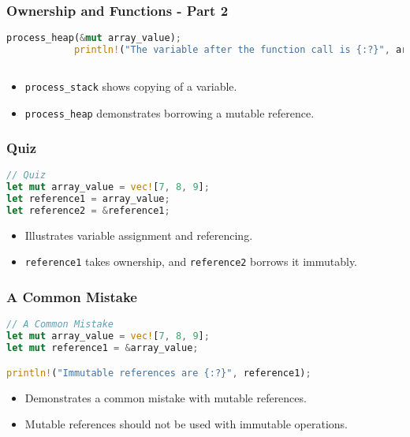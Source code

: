 \documentclass[aspectratio=169, table]{beamer}
\begin{document}
	\begin{frame}[fragile]
		\frametitle{Ownership and Functions - Part 2}
		\begin{lstlisting}[language=Rust]
			process_heap(&mut array_value);  
			println!("The variable after the function call is {:?}", array_value);  
			
	\end{lstlisting}
	\begin{itemize}
		\item \texttt{process\_stack} shows copying of a variable.
		\item \texttt{process\_heap} demonstrates borrowing a mutable reference.
	\end{itemize}
\end{frame}

\begin{frame}[fragile]
\frametitle{Quiz}
\begin{lstlisting}[language=Rust]
// Quiz
let mut array_value = vec![7, 8, 9]; 
let reference1 = array_value;    
let reference2 = &reference1; 
\end{lstlisting}
\begin{itemize}
\item Illustrates variable assignment and referencing.
\item \texttt{reference1} takes ownership, and \texttt{reference2} borrows it immutably.
\end{itemize}
\end{frame}

\begin{frame}[fragile]
\frametitle{A Common Mistake}
\begin{lstlisting}[language=Rust]
// A Common Mistake
let mut array_value = vec![7, 8, 9]; 
let mut reference1 = &array_value; 

println!("Immutable references are {:?}", reference1); 
\end{lstlisting}
\begin{itemize}
\item Demonstrates a common mistake with mutable references.
\item Mutable references should not be used with immutable operations.
\end{itemize}
\end{frame}
\end{document}
